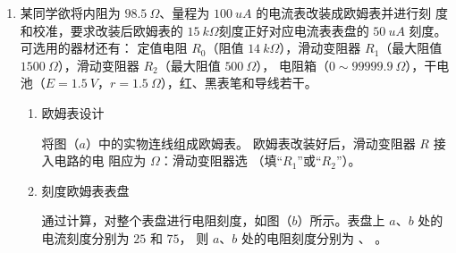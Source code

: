 



\begin{enumerate}
\item
{}
某同学欲将内阻为 $ 98.5 \ \Omega $、量程为 $ 100 \ uA $ 的电流表改装成欧姆表并进行刻
度和校准，要求改装后欧姆表的 $ 15 \ k\Omega $刻度正好对应电流表表盘的 $ 50 \ uA $ 刻度。可选用的器材还有：
定值电阻 $ R_{0} $（阻值 $ 14 \ k\Omega $），滑动变阻器 $ R_{1} $（最大阻值 $ 1500 \ \Omega $），滑动变阻器 $ R_{2} $（最大阻值 $ 500 \ \Omega $），
电阻箱（$ 0 \sim 99999.9 \ \Omega $），干电池（$ E=1.5 \ V $，$ r=1.5 \ \Omega $），红、黑表笔和导线若干。
\begin{figure}[h!]
\centering
\begin{subfigure}{0.4\linewidth}
\centering
 
\caption{}\label{}
\end{subfigure}
\begin{subfigure}{0.4\linewidth}
\centering
 
\caption{}\label{}
\end{subfigure}
\begin{subfigure}{0.4\linewidth}
\centering
 
\caption{}\label{}
\end{subfigure}
\end{figure}


\begin{enumerate}
\item
欧姆表设计

将图（$ a $）中的实物连线组成欧姆表。
欧姆表改装好后，滑动变阻器 $ R $ 接入电路的电
阻应为 \underlinegap $ \Omega $：滑动变阻器选 \underlinegap （填“$ R_{1} $”或“$ R_{2} $”）。



\item 
刻度欧姆表表盘

通过计算，对整个表盘进行电阻刻度，如图（$ b $）所示。表盘上 $ a $、$ b $ 处的电流刻度分别为 $ 25 $ 和 $ 75 $，
则 $ a $、$ b $ 处的电阻刻度分别为 \underlinegap 、 \underlinegap 。



\end{enumerate}
\end{enumerate}
